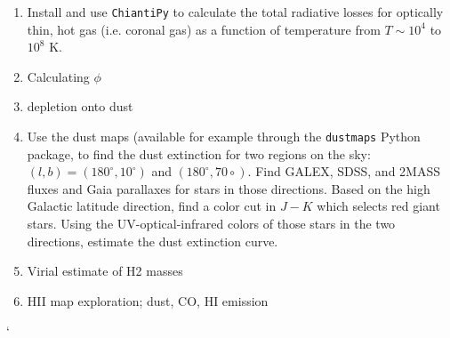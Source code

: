 \begin{enumerate}
\item Install and use {\tt ChiantiPy} to calculate the total radiative
losses for optically thin, hot gas (i.e. coronal gas) as a function of
temperature from $T \sim 10^4$ to $10^8$ K.
\item Calculating $\phi$
\item depletion onto dust
\item Use the \citet{schlegel98a} dust maps (available for example
through the {\tt dustmaps} Python package, to find the dust extinction
for two regions on the sky: $(l, b) = (180^\circ, 10^\circ)$ and
$(180^\circ, 70\circ)$. Find GALEX, SDSS, and 2MASS fluxes and Gaia
parallaxes for stars in those directions. Based on the high Galactic
latitude direction, find a color cut in $J-K$ which selects red giant
stars. Using the UV-optical-infrared colors of those stars in the two
directions, estimate the dust extinction curve.
\item Virial estimate of H2 masses
\item HII map exploration; dust, CO, HI emission
\end{enumerate}`


  
